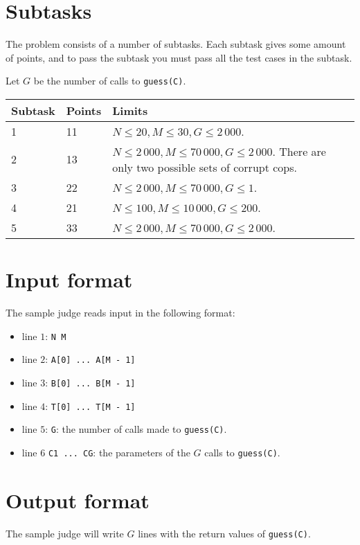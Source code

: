 \section*{Subtasks}
The problem consists of a number of subtasks. Each subtask gives some amount of points, and to pass
the subtask you must pass all the test cases in the subtask.

Let $G$ be the number of calls to \texttt{guess(C)}.

\begin{tabular}{|l|l|l|}
  \hline
  \textbf{Subtask} & \textbf{Points} & \textbf{Limits} \\ \hline
  1 & 11 & $N \le 20, M \le 30, G \le 2\,000$. \\ \hline
  2 & 13 & $N \le 2\,000, M \le 70\,000, G \le 2\,000$. There are only two possible sets of corrupt cops. \\ \hline
  3 & 22 & $N \le 2\,000, M \le 70\,000, G \le 1$. \\ \hline
  4 & 21 & $N \le 100, M \le 10\,000, G \le 200$. \\ \hline
  5 & 33 & $N \le 2\,000, M \le 70\,000, G \le 2\,000$. \\ \hline
\end{tabular}

\section*{Input format}
The sample judge reads input in the following format:

\begin{itemize}
  \item line $1$: \texttt{N M}
  \item line $2$: \texttt{A[0] ... A[M - 1]}
  \item line $3$: \texttt{B[0] ... B[M - 1]}
  \item line $4$: \texttt{T[0] ... T[M - 1]}
  \item line $5$: \texttt{G}: the number of calls made to \texttt{guess(C)}.
  \item line $6$ \texttt{C1 ... CG}: the parameters of the $G$ calls to \texttt{guess(C)}.
\end{itemize}

\section*{Output format}
The sample judge will write $G$ lines with the return values of \texttt{guess(C)}.
